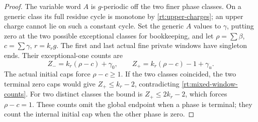 \documentclass[11pt,a4paper]{amsart}
\numberwithin{equation}{section}
\theoremstyle{plain}
\theoremstyle{definition}
\begin{document}
\begin{proof}
The variable word \(A\) is \(g\)-periodic off the two finer phase classes.  On a generic class its full residue cycle is monotone by \eqref{rt:upper-charges}; an upper charge cannot lie on such a constant cycle.  Set the generic \(A\) values to \(\gamma\), putting zero at the two possible exceptional classes for bookkeeping, and let \(\rho=\sum\beta\), \(c=\sum\gamma\), \(r=k_rg\).  The first and last actual fine private windows have singleton ends.  Their exceptional-one counts are
\begin{equation}\label{rt:mixed-window-counts}
 Z_-=k_r(\rho-c)+\gamma_0,\qquad
 Z_+=k_r(\rho-c)-1+\gamma_u.
\end{equation}
The actual initial caps force \(\rho-c\ge1\).  If the two classes coincided, the two terminal zero caps would give \(Z_+\le k_r-2\), contradicting \eqref{rt:mixed-window-counts}.  For two distinct classes the bound is \(Z_+\le2k_r-2\), which forces \(\rho-c=1\).  These counts omit the global endpoint when a phase is terminal; they count the internal initial cap when the other phase is zero.


\end{proof}
\end{document}
